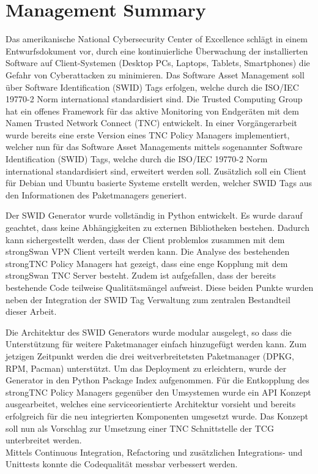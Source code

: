 \chapter{Management Summary}


Das amerikanische National Cybersecurity Center of Excellence schlägt in einem
Entwurfsdokument vor, durch eine kontinuierliche Überwachung der installierten
Software auf Client-Systemen (Desktop PCs, Laptops, Tablets, Smartphones) die
Gefahr von Cyberattacken zu minimieren. Das Software Asset Management soll über
Software Identification (SWID) Tags erfolgen, welche durch die ISO/IEC
19770-2\cite{iso19770-2} Norm international standardisiert sind. Die Trusted
Computing Group hat ein offenes Framework für das aktive Monitoring von
Endgeräten mit dem Namen Trusted Network Connect (TNC) entwickelt. In einer
Vorgängerarbeit wurde bereits eine erste Version eines TNC Policy Managers
implementiert, welcher nun für das Software Asset Managements mittels
sogenannter Software Identification (SWID) Tags, welche durch die ISO/IEC
19770-2 Norm international standardisiert sind, erweitert werden soll.
Zusätzlich soll ein Client für Debian und Ubuntu basierte Systeme erstellt
werden, welcher SWID Tags aus den Informationen des Paketmanagers generiert.


Der SWID Generator wurde vollständig in Python entwickelt. Es wurde darauf
geachtet, dass keine Abhängigkeiten zu externen Bibliotheken bestehen. Dadurch
kann sichergestellt werden, dass der Client problemlos zusammen mit dem
strongSwan VPN Client verteilt werden kann. Die Analyse des bestehenden
strongTNC Policy Managers hat gezeigt, dass eine enge Kopplung mit dem
strongSwan TNC Server besteht. Zudem ist aufgefallen, dass der bereits bestehende Code
teilweise Qualitätsmängel aufweist. Diese beiden Punkte wurden neben der
Integration der SWID Tag Verwaltung zum zentralen Bestandteil dieser Arbeit.

Die Architektur des SWID Generators wurde modular ausgelegt, so dass die
Unterstützung für weitere Paketmanager einfach hinzugefügt werden kann. Zum
jetzigen Zeitpunkt werden die drei weitverbreitetsten Paketmanager (DPKG,
RPM, Pacman) unterstützt. Um das Deployment zu erleichtern, wurde der Generator
in den Python Package Index aufgenommen. Für die Entkopplung des strongTNC
Policy Managers gegenüber den Umsystemen wurde ein API Konzept ausgearbeitet,
welches eine serviceorientierte Architektur vorsieht und bereits erfolgreich für
die neu integrierten Komponenten umgesetzt wurde. Das Konzept soll nun als
Vorschlag zur Umsetzung einer TNC Schnittstelle der TCG unterbreitet werden.\\
Mittels Continuous Integration, Refactoring und zusätzlichen Integrations- und
Unittests konnte die Codequalität messbar verbessert werden.
